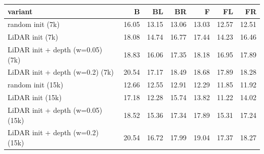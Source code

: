 \footnotesize\renewcommand{\arraystretch}{0.92}
\begin{tabular}{lrrrrrr}
\toprule
variant & B & BL & BR & F & FL & FR \\
\midrule
random init (7k) & 16.05 & 13.15 & 13.06 & 13.03 & 12.57 & 12.51 \\
LiDAR init (7k) & 18.08 & 14.74 & 16.77 & 17.44 & 14.23 & 16.46 \\
LiDAR init + depth (w=0.05) (7k) & 18.83 & 16.06 & 17.35 & 18.18 & 16.95 & 17.89 \\
LiDAR init + depth (w=0.2) (7k) & 20.54 & 17.17 & 18.49 & 18.68 & 17.89 & 18.28 \\
random init (15k) & 12.66 & 12.55 & 12.91 & 12.29 & 11.85 & 11.92 \\
LiDAR init (15k) & 17.18 & 12.28 & 15.74 & 13.82 & 11.22 & 14.02 \\
LiDAR init + depth (w=0.05) (15k) & 18.52 & 15.36 & 17.34 & 17.89 & 15.31 & 17.24 \\
LiDAR init + depth (w=0.2) (15k) & 20.54 & 16.72 & 17.99 & 19.04 & 17.37 & 18.27 \\
\bottomrule
\end{tabular}

